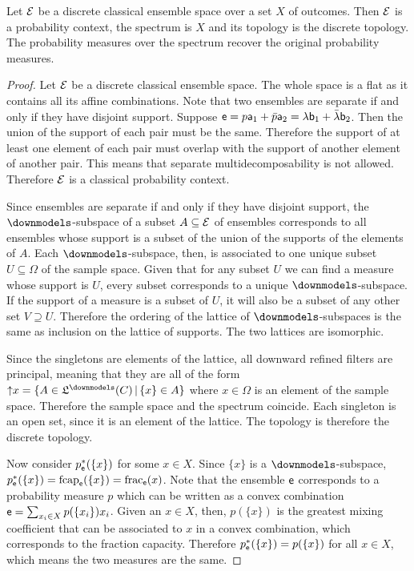 \begin{mathSection}
\begin{prop}
	Let $\Ens$ be a discrete classical ensemble space over a set $X$ of outcomes. Then $\Ens$ is a probability context, the spectrum is $X$ and its topology is the discrete topology. The probability measures over the spectrum recover the original probability measures.
\end{prop}

\begin{proof}
	Let $\Ens$ be a discrete classical ensemble space. The whole space is a flat as it contains all its affine combinations. Note that two ensembles are separate if and only if they have disjoint support. Suppose $\ens = p \ens[a]_1 + \bar{p} \ens[a]_2 = \lambda \ens[b]_1 + \bar{\lambda} \ens[b]_2$. Then the union of the support of each pair must be the same. Therefore the support of at least one element of each pair must overlap with the support of another element of another pair. This means that separate multidecomposability is not allowed. Therefore $\Ens$ is a classical probability context.
	
	Since ensembles are separate if and only if they have disjoint support, the $\separate$-subspace of a subset $A \subseteq \Ens$ of ensembles corresponds to all ensembles whose support is a subset of the union of the supports of the elements of $A$. Each $\separate$-subspace, then, is associated to one unique subset $U \subseteq \Omega$ of the sample space. Given that for any subset $U$ we can find a measure whose support is $U$, every subset corresponds to a unique $\separate$-subspace. If the support of a measure is a subset of $U$, it will also be a subset of any other set $V \supseteq U$. Therefore the ordering of the lattice of $\separate$-subspaces is the same as inclusion on the lattice of supports. The two lattices are isomorphic.
	
	Since the singletons are elements of the lattice, all downward refined filters are principal, meaning that they are all of the form $\uparrow\mathclose{x} = \{A \in \mathfrak{L}^\separate(C) \, | \, \{x\} \in A\}$ where $x \in \Omega$ is an element of the sample space. Therefore the sample space and the spectrum coincide. Each singleton is an open set, since it is an element of the lattice. The topology is therefore the discrete topology.
	
	Now consider $p^*_{\ens}(\{x\})$ for some $x \in X$. Since $\{x\}$ is a $\separate$-subspace, $p^*_{\ens}(\{x\}) = \fcap_{\ens}(\{x\}) = \size_{\ens}(x)$. Note that the ensemble $\ens$ corresponds to a probability measure $p$ which can be written as a convex combination $\ens = \sum_{x_i \in X} p(\{x_i\}) x_i$. Given an $x \in X$, then, $p(\{x\})$ is the greatest mixing coefficient that can be associated to $x$ in a convex combination, which corresponds to the fraction capacity. Therefore $p^*_{\ens}(\{x\}) = p(\{x\})$ for all $x \in X$, which means the two measures are the same.
\end{proof}
\end{mathSection}

